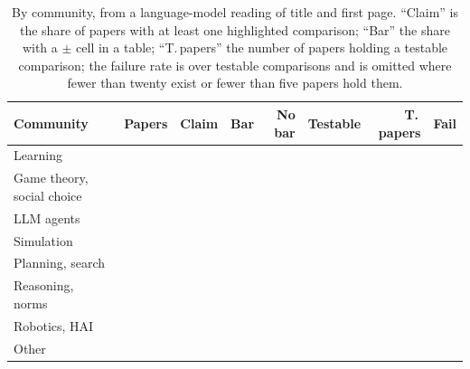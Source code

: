 \documentclass[sigconf,anonymous]{aamas}
\begin{document}
\begin{table}[t]
\caption{By community, from a language-model reading of title and first page.
``Claim'' is the share of papers with at least one highlighted comparison;
``Bar'' the share with a $\pm$ cell in a table; ``T.\,papers'' the number of
papers holding a testable comparison; the failure rate is over testable
comparisons and is omitted where fewer than twenty exist or fewer than five
papers hold them.}
\label{tab:community}
\footnotesize
\setlength{\tabcolsep}{2.6pt}
\begin{tabular}{@{}lrrrrrrr@{}}
\toprule
Community & Papers & Claim & Bar & No bar & Testable & T.\,papers & Fail \\
\midrule
Learning & \nCLearningPapers{} & \nCLearningClaimPapers{} & \nCLearningPapersErr{} & \nCLearningNeither{} & \nCLearningTestable{} & \nCLearningTestablePapers{} & \nCLearningFail{} \\
Game theory, social choice & \nCGameTheorySocialChoicePapers{} & \nCGameTheorySocialChoiceClaimPapers{} & \nCGameTheorySocialChoicePapersErr{} & \nCGameTheorySocialChoiceNeither{} & \nCGameTheorySocialChoiceTestable{} & \nCGameTheorySocialChoiceTestablePapers{} & \nCGameTheorySocialChoiceFail{} \\
LLM agents & \nCLlmAgentsPapers{} & \nCLlmAgentsClaimPapers{} & \nCLlmAgentsPapersErr{} & \nCLlmAgentsNeither{} & \nCLlmAgentsTestable{} & \nCLlmAgentsTestablePapers{} & \nCLlmAgentsFail{} \\
Simulation & \nCSimulationPapers{} & \nCSimulationClaimPapers{} & \nCSimulationPapersErr{} & \nCSimulationNeither{} & \nCSimulationTestable{} & \nCSimulationTestablePapers{} & \nCSimulationFail{} \\
Planning, search & \nCPlanningSearchPapers{} & \nCPlanningSearchClaimPapers{} & \nCPlanningSearchPapersErr{} & \nCPlanningSearchNeither{} & \nCPlanningSearchTestable{} & \nCPlanningSearchTestablePapers{} & \nCPlanningSearchFail{} \\
Reasoning, norms & \nCReasoningNormsPapers{} & \nCReasoningNormsClaimPapers{} & \nCReasoningNormsPapersErr{} & \nCReasoningNormsNeither{} & \nCReasoningNormsTestable{} & \nCReasoningNormsTestablePapers{} & \nCReasoningNormsFail{} \\
Robotics, HAI & \nCRoboticsHaiPapers{} & \nCRoboticsHaiClaimPapers{} & \nCRoboticsHaiPapersErr{} & \nCRoboticsHaiNeither{} & \nCRoboticsHaiTestable{} & \nCRoboticsHaiTestablePapers{} & \nCRoboticsHaiFail{} \\
Other & \nCOtherPapers{} & \nCOtherClaimPapers{} & \nCOtherPapersErr{} & \nCOtherNeither{} & \nCOtherTestable{} & \nCOtherTestablePapers{} & \nCOtherFail{} \\
\bottomrule
\end{tabular}
\end{table}
\end{document}
